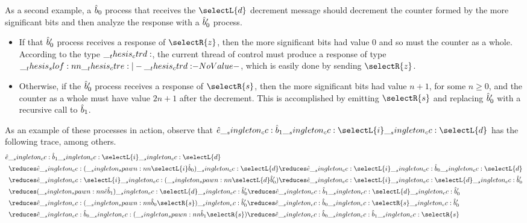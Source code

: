 As a second example, a $\hat{b}_0$ process that receives the $\selectL{d}$ decrement message should decrement the counter formed by the more significant bits and then analyze the response with a $\hat{b}'_0$ process.
\begin{itemize}
\item If that $\hat{b}'_0$ process receives a response of $\selectR{z}$, then the more significant bits had value $0$ and so must the counter as a whole.
  According to the type $\__thesis_ctrd:$, the current thread of control must produce a response of type $\slof{\ctre |- \ctrd}$, which is easily done by sending $\selectR{z}$.
\item Otherwise, if the $\hat{b}'_0$ process receives a response of $\selectR{s}$, then the more significant bits had value $n+1$, for some $n \geq 0$, and the counter as a whole must have value $2n+1$ after the decrement.
  This is accomplished by emitting $\selectR{s}$ and replacing $\hat{b}'_0$ with a recursive call to $\hat{b}_1$.
\end{itemize}

As an example of these processes in action, observe that $\defp{e} \cc \defp{b}_1 \cc \selectL{i} \cc \selectL{d}$ has the following trace, among others.
\begin{align*}
  \MoveEqLeft[.5]
  \defp{e} \cc \defp{b}_1 \cc \selectL{i} \cc \selectL{d} \\
    &\reduces \defp{e} \cc (\spawn{\selectL{i}}{\defp{b}_0}) \cc \selectL{d}
     \reduces \defp{e} \cc \selectL{i} \cc \defp{b}_0 \cc \selectL{d} \\
    &\reduces \defp{e} \cc \selectL{i} \cc (\spawn{\selectL{d}}{\defp{b}'_0})
     \reduces \defp{e} \cc \selectL{i} \cc \selectL{d} \cc \defp{b}'_0 \\
    &\reduces (\spawn{\defp{e}}{\defp{b}_1}) \cc \selectL{d} \cc \defp{b}'_0
     \reduces \defp{e} \cc \defp{b}_1 \cc \selectL{d} \cc \defp{b}'_0 \\
    &\reduces \defp{e} \cc (\spawn{\defp{b}_0}{\selectR{s}}) \cc \defp{b}'_0
     \reduces \defp{e} \cc \defp{b}_0 \cc \selectR{s} \cc \defp{b}'_0 \\
    &\reduces \defp{e} \cc \defp{b}_0 \cc (\spawn{\defp{b}_1}{\selectR{s}})
     \reduces \defp{e} \cc \defp{b}_0 \cc \defp{b}_1 \cc \selectR{s}
\end{align*}



